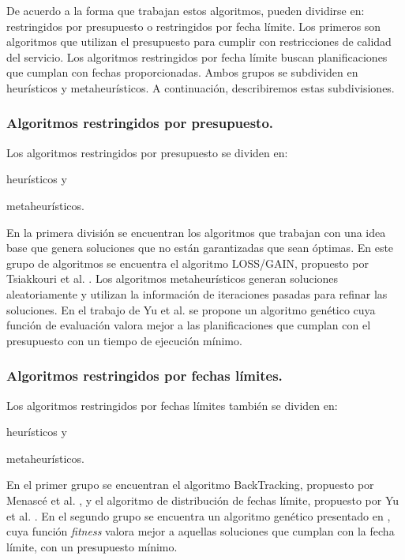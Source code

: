 De acuerdo a la forma que trabajan estos algoritmos, pueden dividirse en: restringidos por presupuesto o restringidos por fecha límite. Los primeros son algoritmos que utilizan el presupuesto para cumplir con restricciones de calidad del servicio. Los algoritmos restringidos por fecha límite buscan planificaciones que cumplan con fechas proporcionadas. Ambos grupos se subdividen en heurísticos y metaheurísticos. A continuación, describiremos estas subdivisiones.


\subsubsection{Algoritmos restringidos por presupuesto.}

Los algoritmos restringidos por presupuesto se dividen en: 
\begin{enumerate*}[label=\alph*)]
\item{heurísticos y}
\item{metaheurísticos.}
\end{enumerate*}

En la primera división se encuentran los algoritmos que trabajan con una idea base que genera soluciones que no están garantizadas que sean óptimas. En este grupo de algoritmos se encuentra el algoritmo LOSS/GAIN, propuesto por Tsiakkouri et al. \cite{sakellariou2007scheduling}. Los algoritmos metaheurísticos generan soluciones aleatoriamente y utilizan la información de iteraciones pasadas para refinar las soluciones. En el trabajo de Yu et al. \cite{yu2006scheduling} se propone un algoritmo genético cuya función de evaluación valora mejor a las planificaciones que cumplan con el presupuesto con un tiempo de ejecución mínimo.


\subsubsection{Algoritmos restringidos por fechas límites.}

Los algoritmos restringidos por fechas límites también se dividen en:
\begin{enumerate*}[label=\alph*)]
\item{heurísticos y}
\item{metaheurísticos.}
\end{enumerate*}

En el primer grupo se encuentran el algoritmo BackTracking, propuesto por Menascé et al. \cite{menasce2004framework}, y el algoritmo de distribución de fechas límite, propuesto por Yu et al. \cite{yu2005cost}. En el segundo grupo se encuentra un algoritmo genético presentado en \cite{yu2006scheduling}, cuya función \emph{fitness} valora mejor a aquellas soluciones que cumplan con la fecha límite, con un presupuesto mínimo.


